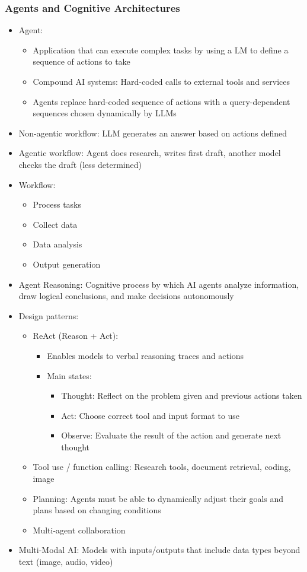 \documentclass[11pt]{scrartcl}
\begin{document}
\subsubsection*{Agents and Cognitive Architectures}
\begin{itemize}
	\item Agent: 
	\begin{itemize}
		\item Application that can execute complex tasks by using a LM to define a sequence of actions to take
		\item Compound AI systems: Hard-coded calls to external tools and services
		\item Agents replace hard-coded sequence of actions with a query-dependent sequences chosen dynamically by LLMs
	\end{itemize}
	\item Non-agentic workflow: LLM generates an answer based on actions defined
	\item Agentic workflow: Agent does research, writes first draft, another model checks the draft (less determined)
	\item Workflow:
	\begin{itemize}
		\item Process tasks
		\item Collect data
		\item Data analysis
		\item Output generation
	\end{itemize}
	\item Agent Reasoning: Cognitive process by which AI agents analyze information, draw logical conclusions, and make decisions autonomously
	\item Design patterns:
	\begin{itemize}
		\item ReAct (Reason + Act):
		\begin{itemize}
			\item Enables models to verbal reasoning traces and actions
			\item Main states:
			\begin{itemize}
				\item Thought: Reflect on the problem given and previous actions taken
				\item Act: Choose correct tool and input format to use
				\item Observe: Evaluate the result of the action and generate next thought
			\end{itemize}
		\end{itemize}
		\item Tool use / function calling: Research tools, document retrieval, coding, image
		\item Planning: Agents must be able to dynamically adjust their goals and plans based on changing conditions
		\item Multi-agent collaboration
	\end{itemize}
	\item Multi-Modal AI: Models with inputs/outputs that include data types beyond text (image, audio, video)
\end{itemize}
\end{document}
